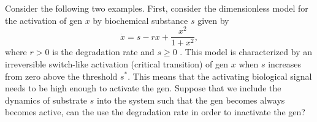 \documentclass[12pt]{article}
\begin{document}
Consider the following two examples. First, consider the dimensionless model for the activation of gen $x$ by biochemical substance $s$ given by
\begin{equation}
    \dot x = s - rx + \frac{x^{2}}{1+x^{2}},
    \label{equ:Application:GenActivation:1D}
\end{equation}
where $r>0$ is the degradation rate and $s\geq 0$ \citep{Strogatz1994, Lewis1977}. This model is characterized by an irreversible switch-like activation (critical transition) of gen $x$ when $s$ increases from zero above the threshold $s^*$. This means that the activating biological signal needs to be high enough to activate the gen. Suppose that we include the dynamics of substrate $s$ into the system such that the gen becomes always becomes active,
can the use the degradation rate in order to inactivate the gen?
\end{document}
